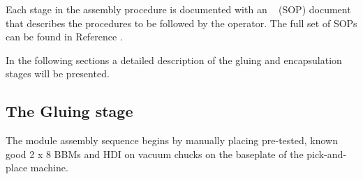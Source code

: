 Each stage in the assembly procedure is documented with an ~ (SOP) document that describes the procedures to be followed by the operator. The full set of SOPs can be found in Reference \cite{unl_sop}.     


In the following sections a detailed description of the gluing and encapsulation stages will be presented. 























































\subsection{The Gluing stage}


The module assembly sequence begins by manually placing pre-tested, known good 2 x 8 BBMs and HDI
on vacuum chucks on the baseplate of the pick-and-place machine.


